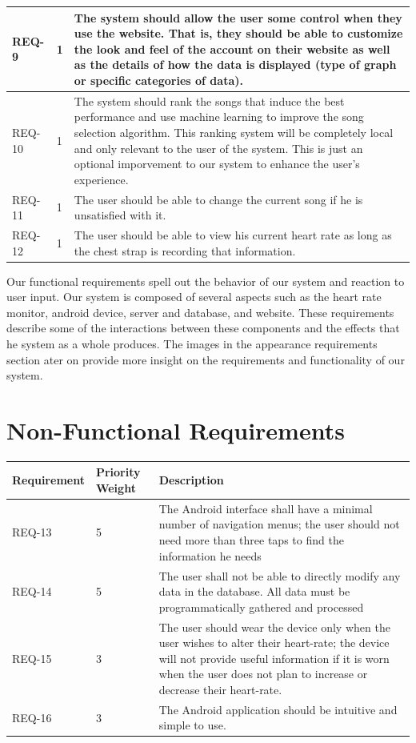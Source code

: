 \documentclass[letterpaper,english, 12pt]{scrreprt}
\begin{document}
\begin{center}
\begin{tabular}{|C{2cm}|C{2cm}|C{8cm}|}
			REQ-9 & 1 & The system should allow the user some control when they use the website. That is, they should be able to customize the look and feel of the account on their website as well as the details of how the data is displayed (type of graph or specific categories of data).\\
		\hline
			REQ-10 & 1 & The system should rank the songs that induce the best performance and use machine learning to improve the song selection algorithm. This ranking system will be completely local and only relevant to the user of the system. This is just an optional imporvement to our system to enhance the user's experience.\\
		\hline
                        REQ-11 & 1 & The user should be able to change the current song if he is unsatisfied with it. \\
                \hline
                        REQ-12 & 1 & The user should be able to view his current heart rate as long as the chest strap is recording that information. \\
		\hline
	\end{tabular}
\end{center}

Our functional requirements spell out the behavior of our system and reaction to
user input. Our system is composed of several aspects such as the heart rate
monitor, android device, server and database, and website. These requirements
describe some of the interactions between these components and the effects that
he system as a whole produces. The images in the appearance requirements section
ater on provide more insight on the requirements and functionality of our system.

\section{Non-Functional Requirements}
\begin{center}
	\begin{tabular}{|C{2cm}|C{2cm}|C{8cm}|}
		\hline
			Requirement & Priority Weight & Description \\
		\hline
			REQ-13 & 5 & The Android interface shall have a minimal number of navigation menus; the user should not need more than three taps to find the information he needs \\
		\hline
			REQ-14 & 5 & The user shall not be able to directly modify any data in the database. All data must be programmatically gathered and processed \\
		\hline
			REQ-15 & 3 & The user should wear the device only when the user wishes to alter their heart-rate; the device will not provide useful information if it is worn when the user does not plan to increase or decrease their heart-rate. \\
		\hline
			REQ-16 & 3 & The Android application should be intuitive and simple to use. \\
		\hline
	\end{tabular}
\end{center}
\end{document}
